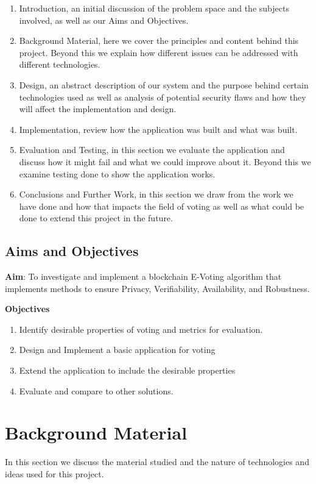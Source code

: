 \documentclass{entcs}
\begin{document}
\begin{enumerate}
    \item Introduction, an initial discussion of the problem space and the subjects involved, as well as our Aims and Objectives.
    \item Background Material, here we cover the principles and content behind this project. Beyond this we explain how different issues can be addressed with different technologies.
    \item Design, an abstract description of our system and the purpose behind certain technologies used as well as analysis of potential security flaws and how they will affect the implementation and design.
    \item Implementation, review how the application was built and what was built.
    \item Evaluation and Testing, in this section we evaluate the application and discuss how it might fail and what we could improve about it. Beyond this we examine testing done to show the application works.
    \item Conclusions and Further Work, in this section we draw from the work we have done and how that impacts the field of voting as well as what could be done to extend this project in the future.
\end{enumerate}

\subsection{Aims and Objectives}
\begin{center}
    {\bf Aim}: To investigate and implement a blockchain E-Voting algorithm that implements methods to ensure Privacy, Verifiability, Availability, and Robustness. 
\end{center}
{\bf Objectives}
\begin{enumerate}
    \item Identify desirable properties of voting and metrics for evaluation.
    \item Design and Implement a basic application for voting
    \item Extend the application to include the desirable properties
    \item Evaluate and compare to other solutions.
\end{enumerate}


\section{Background Material}
In this section we discuss the material studied and the nature of technologies and ideas used for this project.
\end{document}
